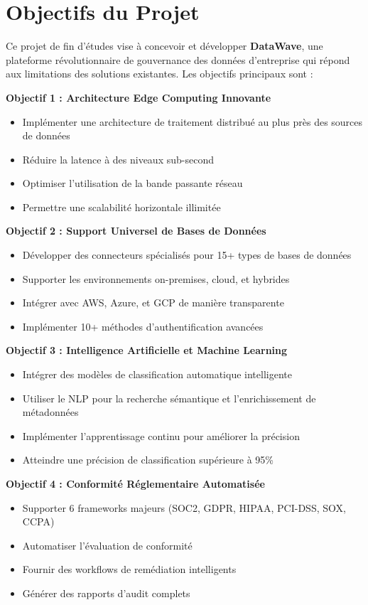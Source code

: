 \section*{Objectifs du Projet}

Ce projet de fin d'études vise à concevoir et développer \textbf{DataWave}, une plateforme révolutionnaire de gouvernance des données d'entreprise qui répond aux limitations des solutions existantes. Les objectifs principaux sont :

\textbf{Objectif 1 : Architecture Edge Computing Innovante}
\begin{itemize}
    \item Implémenter une architecture de traitement distribué au plus près des sources de données
    \item Réduire la latence à des niveaux sub-second
    \item Optimiser l'utilisation de la bande passante réseau
    \item Permettre une scalabilité horizontale illimitée
\end{itemize}

\textbf{Objectif 2 : Support Universel de Bases de Données}
\begin{itemize}
    \item Développer des connecteurs spécialisés pour 15+ types de bases de données
    \item Supporter les environnements on-premises, cloud, et hybrides
    \item Intégrer avec AWS, Azure, et GCP de manière transparente
    \item Implémenter 10+ méthodes d'authentification avancées
\end{itemize}

\textbf{Objectif 3 : Intelligence Artificielle et Machine Learning}
\begin{itemize}
    \item Intégrer des modèles de classification automatique intelligente
    \item Utiliser le NLP pour la recherche sémantique et l'enrichissement de métadonnées
    \item Implémenter l'apprentissage continu pour améliorer la précision
    \item Atteindre une précision de classification supérieure à 95\%
\end{itemize}

\textbf{Objectif 4 : Conformité Réglementaire Automatisée}
\begin{itemize}
    \item Supporter 6 frameworks majeurs (SOC2, GDPR, HIPAA, PCI-DSS, SOX, CCPA)
    \item Automatiser l'évaluation de conformité
    \item Fournir des workflows de remédiation intelligents
    \item Générer des rapports d'audit complets
\end{itemize}

